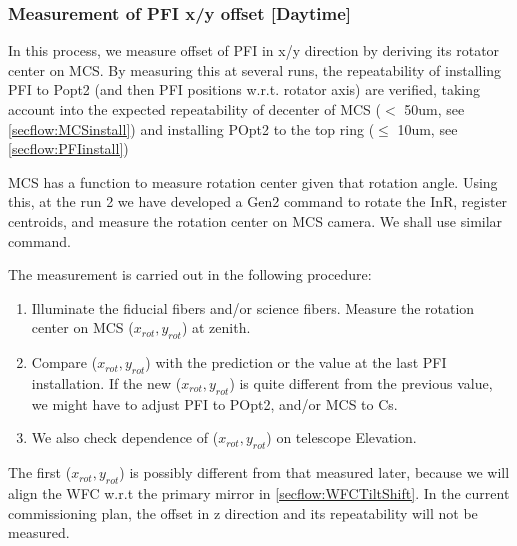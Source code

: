 \subsubsection{Measurement of PFI x/y offset [Daytime]}\label{secflow:PFIoffset}

In this process, we measure offset of PFI in x/y direction by deriving its rotator center on MCS.
By measuring this at several runs, the repeatability of installing PFI to Popt2 (and then PFI positions w.r.t. rotator axis) are verified, taking account into the expected repeatability of decenter of MCS ($<$ 50um, see \ref{secflow:MCSinstall}) and installing POpt2 to the top ring ($\leq$ 10um, see \ref{secflow:PFIinstall})

MCS has a function to measure rotation center given that rotation angle.
Using this, at the run 2 we have developed a Gen2 command to rotate the InR, register centroids, and measure the rotation center on MCS camera.
We shall use similar command.

The measurement is carried out in the following procedure:
\begin{enumerate}
\item Illuminate the fiducial fibers and/or science fibers. 
Measure the rotation center on MCS ($x_{rot}, y_{rot}$) at zenith.
\item Compare ($x_{rot}, y_{rot}$) with the prediction or the value at the last PFI installation. 
If the new ($x_{rot}, y_{rot}$) is quite different from the previous value, we might have to adjust PFI to POpt2, and/or MCS to Cs.
\item We also check dependence of ($x_{rot}, y_{rot}$) on telescope Elevation.
\end{enumerate}

The first ($x_{rot}, y_{rot}$) is possibly different from that measured later, because we will align the WFC w.r.t the primary mirror in \ref{secflow:WFCTiltShift}.
In the current commissioning plan, the offset in z direction and its repeatability will not be measured.

